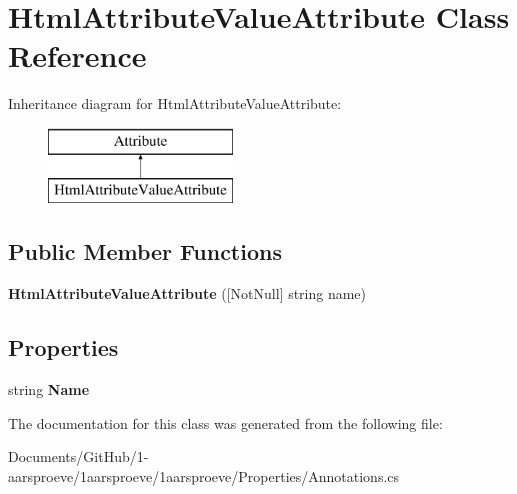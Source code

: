 \hypertarget{class_html_attribute_value_attribute}{}\section{Html\+Attribute\+Value\+Attribute Class Reference}
\label{class_html_attribute_value_attribute}
Inheritance diagram for Html\+Attribute\+Value\+Attribute\+:\begin{figure}[H]
\begin{center}
\leavevmode
\includegraphics[height=2.000000cm]{class_html_attribute_value_attribute}
\end{center}
\end{figure}
\subsection*{Public Member Functions}
\begin{DoxyCompactItemize}
\item 
\hypertarget{class_html_attribute_value_attribute_a24f0c95d001e3e601263186ca45098a4}{}{\bfseries Html\+Attribute\+Value\+Attribute} (\mbox{[}Not\+Null\mbox{]} string name)\label{class_html_attribute_value_attribute_a24f0c95d001e3e601263186ca45098a4}

\end{DoxyCompactItemize}
\subsection*{Properties}
\begin{DoxyCompactItemize}
\item 
\hypertarget{class_html_attribute_value_attribute_ae46f5471839e8bf67fe5177f2b01e514}{}string {\bfseries Name}\label{class_html_attribute_value_attribute_ae46f5471839e8bf67fe5177f2b01e514}

\end{DoxyCompactItemize}


The documentation for this class was generated from the following file\+:\begin{DoxyCompactItemize}
\item 
Documents/\+Git\+Hub/1-\/aarsproeve/1aarsproeve/1aarsproeve/\+Properties/Annotations.\+cs\end{DoxyCompactItemize}
